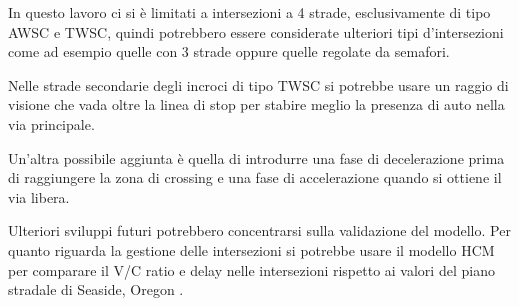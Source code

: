 In questo lavoro ci si è limitati a intersezioni a 4 strade, esclusivamente di tipo AWSC e TWSC, quindi potrebbero essere considerate
ulteriori tipi d'intersezioni come ad esempio quelle con 3 strade oppure quelle regolate da semafori.

Nelle strade secondarie degli incroci di tipo TWSC si potrebbe usare un raggio di visione che vada oltre la linea di stop
per stabire meglio la presenza di auto nella via principale.

Un'altra possibile aggiunta è quella di introdurre una fase di decelerazione prima di raggiungere la zona di crossing e una fase 
di accelerazione quando si ottiene il via libera.

Ulteriori sviluppi futuri potrebbero concentrarsi sulla validazione del modello. 
Per quanto riguarda la gestione delle intersezioni si potrebbe usare il modello HCM \parencite{transportation2000highway} 
per comparare il V/C ratio e delay nelle intersezioni rispetto ai valori del piano stradale di Seaside, Oregon \parencite{seaside2010tsp}.
